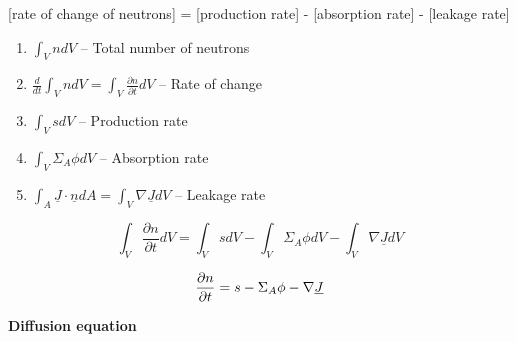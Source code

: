 \documentclass[aspectratio=1610,pdftex,dvipsnames,compress,xcolor={dvipsnames}]{beamer}
\begin{document}
\addtocounter{framenumber}{-2} 
\begin{frame}{\normalsize[rate of change of neutrons] = [production rate] - [absorption rate] - [leakage rate]}
    \begin{enumerate}[series=outerlist,topsep=0pt,itemsep=21pt,leftmargin=*,label=(\arabic*)]
        \item[]$\int_V n dV$ -- Total number of neutrons
        \item[]$\frac{d}{dt} \int_V n dV = \int_V \frac{\partial n}{\partial t} dV$ -- Rate of change
        \item[]$\int_V sdV$ -- Production rate
        \item[]$\int_V \Sigma_A \phi dV$ -- Absorption rate
        \item[]$\int_A \underline{J} \cdot \underline{n} dA = \int_V \nabla \underline{J} dV$ -- Leakage rate
    \end{enumerate}
\end{frame}


\begin{frame}[plain]{}
    \LARGE
    \begin{equation*}
        \int_V \frac{\partial{n}}{\partial{t}} dV = 
        \int_V s dV - \int_V \Sigma_A \phi dV - \int_V \nabla \underline{J} dV
    \end{equation*}
\end{frame}


\begin{frame}[plain]{}
    \begin{equation}
        \LARGE
        \frac{\partial{n}}{\partial{t}} = s - \Sigma_A \phi - \nabla \underline{J}
    \end{equation}
\end{frame}


\begin{frame}[plain]{}
    \centering\LARGE\textbf{Diffusion equation}
\end{frame}
\end{document}

